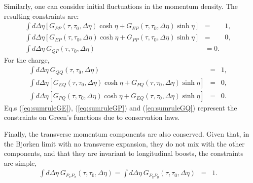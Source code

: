 \documentclass[12pt]{article}
\numberwithin{equation}{section}
\numberwithin{figure}{section}
\begin{document}
Similarly, one can consider initial fluctuations in the momentum density. The resulting constraints are:
\begin{eqnarray}\label{eq:sumruleGP}
\int d\Delta\eta\left[G_{PP}(\tau,\tau_0,\Delta\eta)\cosh\eta+G_{EP}(\tau,\tau_0,\Delta\eta)\sinh\eta\right]&=&1,\\
\nonumber
\int d\Delta\eta\left[G_{EP}(\tau,\tau_0,\Delta\eta)\cosh\eta+G_{PP}(\tau,\tau_0,\Delta\eta)\sinh\eta\right]&=&0,\\
\nonumber
\int d\Delta\eta~G_{QP}(\tau,\tau_0,\Delta\eta)&=0.
\end{eqnarray}
For the charge,
\begin{eqnarray}\label{eq:sumruleGQ}
\int d\Delta\eta~G_{QQ}(\tau,\tau_0,\Delta\eta)&=&1,\\
\nonumber
\int d\Delta\eta\left[G_{EQ}(\tau,\tau_0,\Delta\eta)\cosh\eta+G_{PQ}(\tau,\tau_0,\Delta\eta)\sinh\eta\right]&=&0,\\
\nonumber
\int d\Delta\eta\left[G_{PQ}(\tau,\tau_0,\Delta\eta)\cosh\eta+G_{EQ}(\tau,\tau_0,\Delta\eta)\sinh\eta\right]&=&0.
\end{eqnarray}
Eq.s (\ref{eq:sumruleGE}), (\ref{eq:sumruleGP}) and (\ref{eq:sumruleGQ}) represent the constraints on Green's functions due to conservation laws.

Finally, the transverse momentum components are also conserved. Given that, in the Bjorken limit with no transverse expansion, they do not mix with the other components, and that they are invariant to longitudinal boosts, the constraints are simple,
\begin{eqnarray}
\int d\Delta\eta~G_{P_xP_x}(\tau,\tau_0,\Delta\eta)=\int d\Delta\eta~G_{P_yP_y}(\tau,\tau_0,\Delta\eta)&=&1.
\end{eqnarray}
\end{document}
